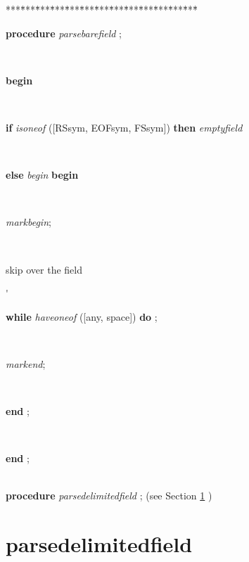 \begin{tabbing}
***\=***\=***\=***\=***\=***\=***\=***\=***\=***\=***\=***\=***\=\kill
\parbox{14cm}{\textsf{\textbf{procedure}  \textit{parsebarefield} ;}}\\
\+\parbox{14cm}{\textsf{\textbf{begin} }}\\
\+\parbox{14cm}{\textsf {\textbf {if } \textsf{\textit{isoneof} (\textit{}[RSsym, EOFsym, FSsym])} \textbf{ then } \textsf{\textit{emptyfield}}}}\\
\<\<\parbox{14cm}{\textsf {\textbf {else } \textsf{\textit{begin}} \textbf{ begin } }}\\
\parbox{14cm}{\textsf{\textit{markbegin}}; }\\
\<\<\parbox{3.5cm}{\scriptsize{skip over the field}}\'\>\>\parbox{14cm}{\textsf {\textbf {while } \textsf{\textit{haveoneof} (\textit{}[any, space])} \textbf{ do } \textsf{ ;}}}\\
\parbox{14cm}{\textsf{\textit{markend}}; }\\
\<\-\parbox{14cm}{\textsf{\textbf{end} ;}}\\
\<\-\parbox{14cm}{\textsf{\textbf{end} ;}}\\
\+\textsf{\textbf{procedure}  \textit{parsedelimitedfield} ;} (see Section \ref{sec:csvfilereader/getdatamatrix/recursedown/recurse/getcolheaders/recurse/getrowheaders/recurse/colcount/getcell/removetrailingnull/onlynulls/rowcount/isint/printcsv/parsecsvfile/thetoken/peek/isoneof/nextsymbol/have/haveoneof/initialise/resolvealpha/resolvedigits/resolvetoken/markbegin/markend/setalpha/emptyfield/parsebarefieldparsedelimitedfield} )\\
\end{tabbing}
\section{parsedelimitedfield}\label{sec:csvfilereader/getdatamatrix/recursedown/recurse/getcolheaders/recurse/getrowheaders/recurse/colcount/getcell/removetrailingnull/onlynulls/rowcount/isint/printcsv/parsecsvfile/thetoken/peek/isoneof/nextsymbol/have/haveoneof/initialise/resolvealpha/resolvedigits/resolvetoken/markbegin/markend/setalpha/emptyfield/parsebarefieldparsedelimitedfield}

